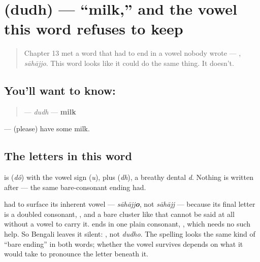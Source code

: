 \section[dudh]{ (dudh) — \textquotedblleft{}milk,\textquotedblright{} and the vowel this word refuses to keep}

\label{lesson:BN-C10-dudh}



\begin{quote}
Chapter 13 met a word that had to end in a vowel nobody wrote — , \emph{sāhājjo}. This word looks like it could do the same thing. It doesn't.
\end{quote}

\subsection*{You'll want to know: }
\begin{quote}
\textbf{} — \emph{dudh} — \textbf{milk}
\end{quote}

\textbf{ } — (please) have some milk.

\subsection*{The letters in this word}
\textbf{} is \textbf{} (\emph{dô}) with the vowel sign \textbf{} (\emph{u}), plus \textbf{} (\emph{dh}), a breathy dental \emph{d}. Nothing is written after  — the same bare-consonant ending  had.

\begin{sounds}
 had to surface its inherent vowel — \emph{sāhājj\textbf{o}}, not \emph{sāhājj} — because its final letter is a doubled consonant, \textbf{}, and a bare cluster like that cannot be said at all without a vowel to carry it.  ends in one plain consonant, , which needs no such help. So Bengali leaves it silent: \textbf{}, not \emph{dudho}. The spelling looks the same kind of \textquotedblleft{}bare ending\textquotedblright{} in both words; whether the vowel survives depends on what it would take to pronounce the letter beneath it.
\end{sounds}

